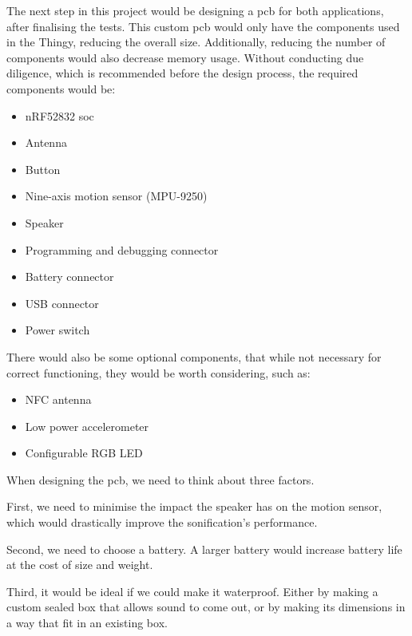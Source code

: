 The next step in this project would be designing a \gls{pcb} for both applications, after finalising the tests. This custom \gls{pcb} would only have the components used in the Thingy, reducing the overall size. Additionally, reducing the number of components would also decrease memory usage. Without conducting due diligence, which is recommended before the design process, the required components would be:
\begin{itemize}
	\item nRF52832 \gls{soc}
	\item Antenna
	\item Button
	\item Nine-axis motion sensor (MPU-9250)
	\item Speaker
	\item Programming and debugging connector
	\item Battery connector
	\item USB connector
	\item Power switch
\end{itemize}

There would also be some optional components, that while not necessary for correct functioning, they would be worth considering, such as:
\begin{itemize}
	\item NFC antenna
	\item Low power accelerometer
	\item Configurable RGB LED
\end{itemize}

When designing the \gls{pcb}, we need to think about three factors.

First, we need to minimise the impact the speaker has on the motion sensor, which would drastically improve the sonification's performance. 

Second, we need to choose a battery. A larger battery would increase battery life at the cost of size and weight. 

Third, it would be ideal if we could make it waterproof. Either by making a custom sealed box that allows sound to come out, or by making its dimensions in a way that fit in an existing box.

